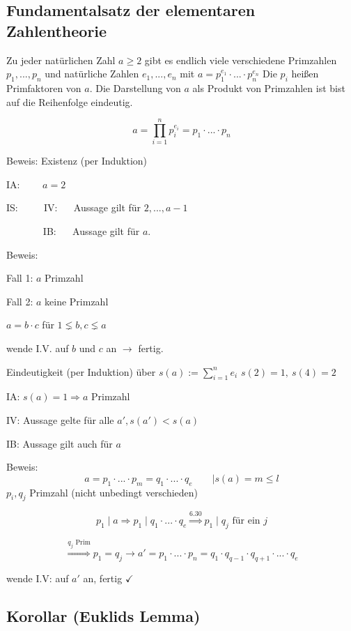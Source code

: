 \documentclass[a4paper, 12pt, twoside] {article}
\begin{document}
\subsection{Fundamentalsatz der elementaren Zahlentheorie}
Zu jeder natürlichen Zahl $a \geq 2$ gibt es endlich viele
verschiedene Primzahlen $p_1, ... ,p_n$ und natürliche Zahlen $e_1, ... ,e_n$ mit
$a = p_{1}^{e_1} \cdot ... \cdot p_{n}^{e_n}$
Die $p_i$ heißen Primfaktoren von $a$. Die Darstellung von $a$ als Produkt von Primzahlen
ist bist auf die Reihenfolge eindeutig.


$$a = \prod_{i=1}^{n} p^{e_i}_i = p_1 \cdot ... \cdot p_n$$

Beweis: Existenz (per Induktion)

IA: $\qquad a = 2$ \checkmark

IS: $\qquad$ IV: $\quad$ Aussage gilt für $2, ..., a-1$

$\qquad\quad\ \ $ IB: $\quad$ Aussage gilt für $a$.

Beweis:

\qquad	Fall 1: $a$ Primzahl \checkmark
	
\qquad	Fall 2: $a$ keine Primzahl
	
\qquad	$a=b \cdot c$ für $1 \lneq b, c \lneq a$
	
\qquad	wende I.V. auf $b$ und $c$ an $\rightarrow$ fertig.
	
Eindeutigkeit (per Induktion) über $s(a) := \sum_{i=1}^{n} e_i$ \hfill $s(2) = 1, \ s(4) = 2$

IA:		$s(a) = 1 \Rightarrow a$ Primzahl \checkmark

IV:		Aussage gelte für alle $a', s(a') < s(a)$

IB:		Aussage gilt auch für $a$

Beweis:
$$a = p_1 \cdot ... \cdot p_m = q_1 \cdot ... \cdot q_e \qquad | s(a) = m \leq l$$
\hfill $p_i, q_j$ Primzahl (nicht unbedingt verschieden)

$$p_1 \mid a \Rightarrow p_1 \mid q_1 \cdot ... \cdot q_e \overset{6.30}{\Rightarrow} p_1 \mid q_j \text{ für ein } j$$

$$\overset{q_j \text{ Prim}}{\Rightarrow} p_1 = q_j \rightarrow a' = p_1 \cdot ... \cdot p_n = q_1 \cdot q_{q-1} \cdot q_{q+1} \cdot ... \cdot q_e$$

\qquad \qquad wende I.V: auf $a'$ an, fertig \hfill $\checkmark$

\subsection{Korollar (Euklids Lemma)} %
\end{document}
